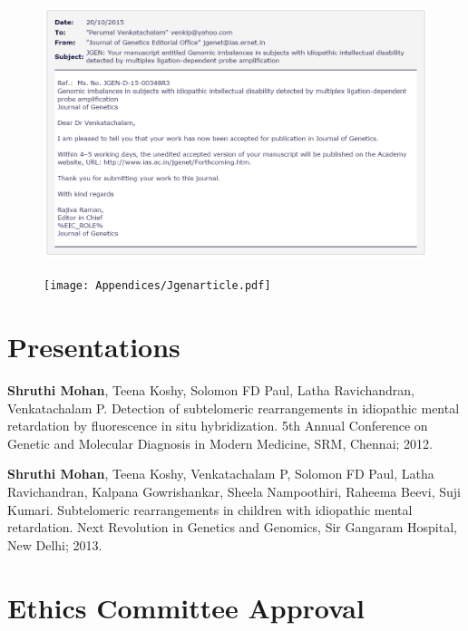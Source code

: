 \begin{figure}[!h]
\includegraphics[width=\linewidth,height=\textheight,keepaspectratio]{Appendices/Jgenacceptance.pdf}
\end{figure}

\begin{figure}[!b]
\texttt{[image: Appendices/Jgenarticle.pdf]}
\end{figure}

\chapter{Presentations}

\textbf{Shruthi Mohan}, Teena Koshy, Solomon FD Paul, Latha Ravichandran, Venkatachalam P. Detection of subtelomeric rearrangements in idiopathic mental retardation by fluorescence in situ hybridization. 5th Annual Conference on Genetic and Molecular Diagnosis in Modern Medicine, SRM, Chennai; 2012.

\textbf{Shruthi Mohan}, Teena Koshy, Venkatachalam P, Solomon FD Paul, Latha Ravichandran, Kalpana Gowrishankar, Sheela Nampoothiri, Raheema Beevi, Suji Kumari. Subtelomeric rearrangements in children with idiopathic mental retardation. Next Revolution in Genetics and Genomics, Sir Gangaram Hospital, New Delhi; 2013.

\cleardoublepage

\chapter{Ethics Committee Approval}

\noindent%
\begin{minipage}{\linewidth}%
\end{minipage}

